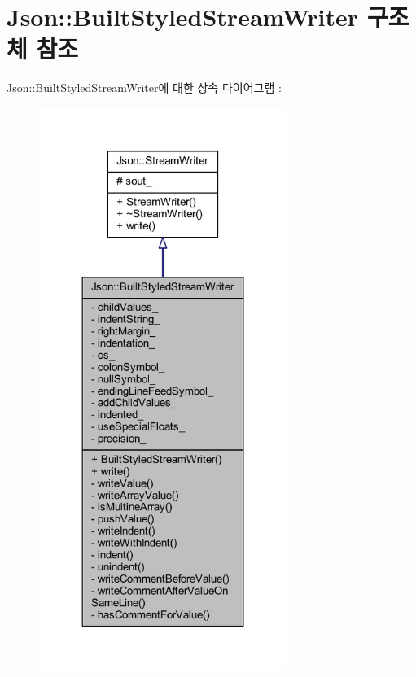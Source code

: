 \hypertarget{struct_json_1_1_built_styled_stream_writer}{}\section{Json\+:\+:Built\+Styled\+Stream\+Writer 구조체 참조}
\label{struct_json_1_1_built_styled_stream_writer}


Json\+:\+:Built\+Styled\+Stream\+Writer에 대한 상속 다이어그램 \+: \nopagebreak
\begin{figure}[H]
\begin{center}
\leavevmode
\includegraphics[width=228pt]{struct_json_1_1_built_styled_stream_writer__inherit__graph}
\end{center}
\end{figure}


